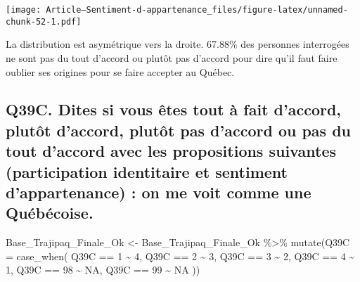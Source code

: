 \documentclass[
]{article}
\newenvironment{Shaded}{\begin{snugshade}}{\end{snugshade}}
\newcommand{\AttributeTok}[1]{\textcolor[rgb]{0.77,0.63,0.00}{#1}}
\newcommand{\ConstantTok}[1]{\textcolor[rgb]{0.00,0.00,0.00}{#1}}
\newcommand{\DecValTok}[1]{\textcolor[rgb]{0.00,0.00,0.81}{#1}}
\newcommand{\FunctionTok}[1]{\textcolor[rgb]{0.00,0.00,0.00}{#1}}
\newcommand{\NormalTok}[1]{#1}
\newcommand{\OtherTok}[1]{\textcolor[rgb]{0.56,0.35,0.01}{#1}}
\newcommand{\SpecialCharTok}[1]{\textcolor[rgb]{0.00,0.00,0.00}{#1}}
\begin{document}
\texttt{[image: Article---Sentiment-d-appartenance\_files/figure-latex/unnamed-chunk-52-1.pdf]}

La distribution est asymétrique vers la droite. 67.88\% des personnes
interrogées ne sont pas du tout d'accord ou plutôt pas d'accord pour
dire qu'il faut faire oublier ses origines pour se faire accepter au
Québec.

\hypertarget{q39c.-dites-si-vous-uxeates-tout-uxe0-fait-daccord-plutuxf4t-daccord-plutuxf4t-pas-daccord-ou-pas-du-tout-daccord-avec-les-propositions-suivantes-participation-identitaire-et-sentiment-dappartenance-on-me-voit-comme-une-quuxe9buxe9coise.}{%
\subsection{Q39C. Dites si vous êtes tout à fait d'accord, plutôt
d'accord, plutôt pas d'accord ou pas du tout d'accord avec les
propositions suivantes (participation identitaire et sentiment
d'appartenance) : on me voit comme une
Québécoise.}\label{q39c.-dites-si-vous-uxeates-tout-uxe0-fait-daccord-plutuxf4t-daccord-plutuxf4t-pas-daccord-ou-pas-du-tout-daccord-avec-les-propositions-suivantes-participation-identitaire-et-sentiment-dappartenance-on-me-voit-comme-une-quuxe9buxe9coise.}}

\begin{Shaded}
\begin{Highlighting}[]
\NormalTok{Base\_Trajipaq\_Finale\_Ok }\OtherTok{\textless{}{-}}
\NormalTok{  Base\_Trajipaq\_Finale\_Ok }\SpecialCharTok{\%\textgreater{}\%}
  \FunctionTok{mutate}\NormalTok{(}\AttributeTok{Q39C =} \FunctionTok{case\_when}\NormalTok{(}
\NormalTok{    Q39C }\SpecialCharTok{==} \DecValTok{1} \SpecialCharTok{\textasciitilde{}} \DecValTok{4}\NormalTok{,}
\NormalTok{    Q39C }\SpecialCharTok{==} \DecValTok{2} \SpecialCharTok{\textasciitilde{}} \DecValTok{3}\NormalTok{,}
\NormalTok{    Q39C }\SpecialCharTok{==} \DecValTok{3} \SpecialCharTok{\textasciitilde{}} \DecValTok{2}\NormalTok{,}
\NormalTok{    Q39C }\SpecialCharTok{==} \DecValTok{4} \SpecialCharTok{\textasciitilde{}} \DecValTok{1}\NormalTok{,}
\NormalTok{    Q39C }\SpecialCharTok{==} \DecValTok{98} \SpecialCharTok{\textasciitilde{}} \ConstantTok{NA}\NormalTok{,}
\NormalTok{    Q39C }\SpecialCharTok{==} \DecValTok{99} \SpecialCharTok{\textasciitilde{}} \ConstantTok{NA}
\NormalTok{  ))}
\end{Highlighting}
\end{Shaded}

\begin{Shaded}
\end{Shaded}
\end{document}
